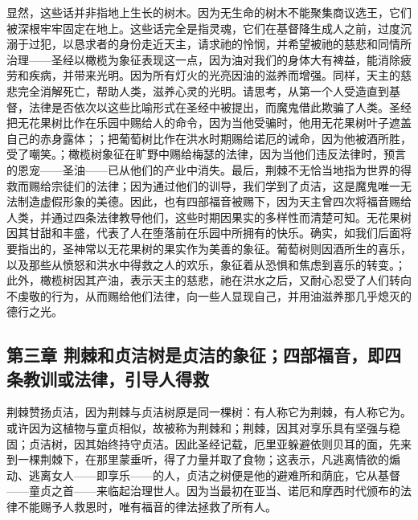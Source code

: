 显然，这些话并非指地上生长的树木。因为无生命的树木不能聚集商议选王，它们被深根牢牢固定在地上。这些话完全是指灵魂，它们在基督降生成人之前，过度沉溺于过犯，以恳求者的身份走近天主，请求祂的怜悯，并希望被祂的慈悲和同情所治理——圣经以橄榄为象征表现这一点，因为油对我们的身体大有裨益，能消除疲劳和疾病，并带来光明。因为所有灯火的光亮因油的滋养而增强。同样，天主的慈悲完全消解死亡，帮助人类，滋养心灵的光明。请思考，从第一个人受造直到基督，法律是否依次以这些比喻形式在圣经中被提出，而魔鬼借此欺骗了人类。圣经把无花果树比作在乐园中赐给人的命令，因为当他受骗时，他用无花果树叶子遮盖自己的赤身露体；；把葡萄树比作在洪水时期赐给诺厄的诫命，因为他被酒所胜，受了嘲笑。；橄榄树象征在旷野中赐给梅瑟的法律，因为当他们违反法律时，预言的恩宠——圣油——已从他们的产业中消失。最后，荆棘不无恰当地指为世界的得救而赐给宗徒们的法律；因为通过他们的训导，我们学到了贞洁，这是魔鬼唯一无法制造虚假形象的美德。因此，也有四部福音被赐下，因为天主曾四次将福音赐给人类，并通过四条法律教导他们，这些时期因果实的多样性而清楚可知。无花果树因其甘甜和丰盛，代表了人在堕落前在乐园中所拥有的快乐。确实，如我们后面将要指出的，圣神常以无花果树的果实作为美善的象征。葡萄树则因酒所生的喜乐，以及那些从愤怒和洪水中得救之人的欢乐，象征着从恐惧和焦虑到喜乐的转变。；此外，橄榄树因其产油，表示天主的慈悲，祂在洪水之后，又耐心忍受了人们转向不虔敬的行为，从而赐给他们法律，向一些人显现自己，并用油滋养那几乎熄灭的德行之光。\par


\subsection{第三章  荆棘和贞洁树是贞洁的象征；四部福音，即四条教训或法律，引导人得救}

荆棘赞扬贞洁，因为荆棘与贞洁树原是同一棵树：有人称它为荆棘，有人称它为。或许因为这植物与童贞相似，故被称为荆棘和；荆棘，因其对享乐具有坚强与稳固；贞洁树，因其始终持守贞洁。因此圣经记载，厄里亚躲避依则贝耳的面，先来到一棵荆棘下，在那里蒙垂听，得了力量并取了食物；这表示，凡逃离情欲的煽动、逃离女人——即享乐——的人，贞洁之树便是他的避难所和荫庇，它从基督——童贞之首——来临起治理世人。因为当最初在亚当、诺厄和摩西时代颁布的法律不能赐予人救恩时，唯有福音的律法拯救了所有人。\par


